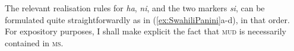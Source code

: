 \begin{exe}
  \ex \label{ex:SwahiliNeg1sg}
  \begin{xlist}
    
    
  \end{xlist}
\end{exe}

The relevant realisation rules for \textit{ha}, \textit{ni}, and the
two markers \textit{si}, can be formulated quite straightforwardly as
in (\ref{ex:SwahiliPanini}a-d), in that order. For expository
purposes, I shall make explicit the fact that \textsc{mud} is necessarily
contained in \textsc{ms}.   

